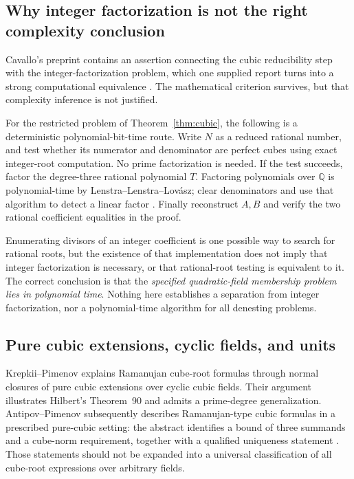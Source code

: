 \documentclass[11pt,a4paper]{article}
\numberwithin{equation}{section}
\theoremstyle{definition}\newtheorem{definition}[theorem]{Definition}
\theoremstyle{remark}\newtheorem{remark}[theorem]{Remark}
\newcommand{\Q}{\mathbb Q}\newcommand{\R}{\mathbb R}\newcommand{\C}{\mathbb C}\newcommand{\Z}{\mathbb Z}
\begin{document}
\subsection{Why integer factorization is not the right complexity conclusion}
Cavallo's preprint contains an assertion connecting the cubic reducibility step with the integer-factorization problem, which one supplied report turns into a strong computational equivalence \cite{cavallo}. The mathematical criterion survives, but that complexity inference is not justified.

For the restricted problem of Theorem~\ref{thm:cubic}, the following is a deterministic polynomial-bit-time route. Write $N$ as a reduced rational number, and test whether its numerator and denominator are perfect cubes using exact integer-root computation. No prime factorization is needed. If the test succeeds, factor the degree-three rational polynomial $T$. Factoring polynomials over $\Q$ is polynomial-time by Lenstra--Lenstra--Lov\'asz; clear denominators and use that algorithm to detect a linear factor \cite{lll}. Finally reconstruct $A,B$ and verify the two rational coefficient equalities in the proof.

Enumerating divisors of an integer coefficient is one possible way to search for rational roots, but the existence of that implementation does not imply that integer factorization is necessary, or that rational-root testing is equivalent to it. The correct conclusion is that the \emph{specified quadratic-field membership problem lies in polynomial time}. Nothing here establishes a separation from integer factorization, nor a polynomial-time algorithm for all denesting problems.

\subsection{Pure cubic extensions, cyclic fields, and units}
Krepkii--Pimenov explains Ramanujan cube-root formulas through normal closures of pure cubic extensions over cyclic cubic fields. Their argument illustrates Hilbert's Theorem~90 and admits a prime-degree generalization. Antipov--Pimenov subsequently describes Ramanujan-type cubic formulas in a prescribed pure-cubic setting: the abstract identifies a bound of three summands and a cube-norm requirement, together with a qualified uniqueness statement \cite{krepkii,antipov}. Those statements should not be expanded into a universal classification of all cube-root expressions over arbitrary fields.
\end{document}
